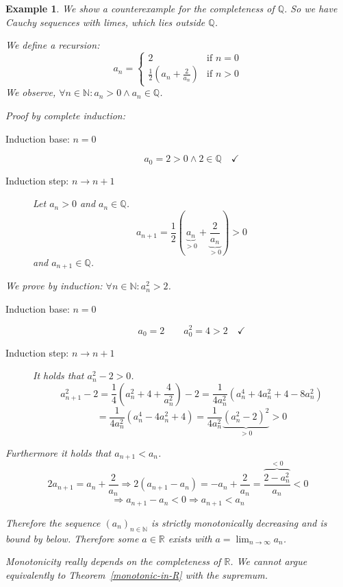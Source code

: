 \documentclass[a4paper,landscape,twocolumn]{article}
\newtheorem{ex}{Example}
\newcommand\seq[1]{{\left(#1\right)}_{n \in \mathbb N}}
\begin{document}
\begin{ex}
  We show a counterexample for the completeness of $\mathbb Q$.
  So we have Cauchy sequences with limes, which lies outside $\mathbb Q$.

  We define a recursion:
  \[
    a_n = \begin{cases}
      2 & \text{if } n = 0 \\
      \frac12 \left(a_n + \frac2{a_n}\right) & \text{if } n > 0
    \end{cases}
  \]
  We observe, $\forall n \in \mathbb N: a_n > 0 \land a_n \in \mathbb Q$.

  Proof by complete induction:
  \begin{description}
    \item[Induction base: $n = 0$]
      \[ a_0 = 2 > 0 \land 2 \in \mathbb Q \quad \checkmark \]
    \item[Induction step: $n \rightarrow n + 1$]
      Let $a_n > 0$ and $a_n \in \mathbb Q$.
      \[ a_{n+1} = \frac12 \left(\underbrace{a_n}_{>0} + \underbrace{\frac2{a_n}}_{>0}\right) > 0 \]
      and $a_{n+1} \in \mathbb Q$.
  \end{description}

  We prove by induction: $\forall n \in \mathbb N: a_n^2 > 2$.
  \begin{description}
    \item[Induction base: $n = 0$]
      \[ a_0 = 2 \qquad a_0^2 = 4 > 2 \quad \checkmark \]
    \item[Induction step: $n \rightarrow n+1$]
      It holds that $a_n^2 - 2 > 0$.
      \[
          a_{n+1}^2 - 2
          = \frac14 \left(a_n^2 + 4 + \frac4{a_n^2}\right) - 2
          = \frac{1}{4a_n^2} \left(a_n^4 + 4a_n^2 + 4 - 8a_n^2\right)
      \] \[
          = \frac{1}{4a_n^2} \left(a_n^4 - 4a_n^2 + 4\right)
          = \frac{1}{4a_n^2} \underbrace{\left(a_n^2 - 2\right)^2}_{>0} > 0
      \]
  \end{description}

  Furthermore it holds that $a_{n+1} < a_n$.
  \[ 2a_{n+1} = a_n + \frac2{a_n} \Rightarrow 2 (a_{n+1} - a_n) = -a_n + \frac2{a_n} = \frac{\overbrace{2 - a_n^2}^{<0}}{a_n} < 0 \]
  \[ \Rightarrow a_{n+1} - a_n < 0 \Rightarrow a_{n+1} < a_n \]

  Therefore the sequence $\seq{a_n}$ is strictly monotonically decreasing and is bound by below.
  Therefore some $a \in \mathbb R$ exists with $a = \lim_{n\to\infty} a_n$.

  Monotonicity really depends on the completeness of $\mathbb R$.
  We cannot argue equivalently to Theorem~\ref{monotonic-in-R} with the supremum.


\end{ex}
\end{document}
